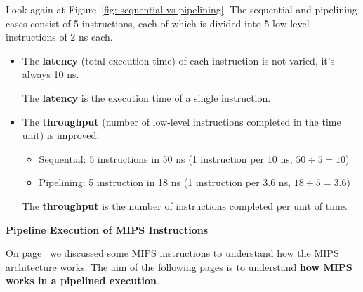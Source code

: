 \documentclass[a4paper]{article}
\newcommand{\definition}[1]{\textcolor{Red3}{\textbf{#1}}\index{#1}}
\newcommand{\highspace}{\vspace{1.2em}\noindent}
\begin{document}
    \highspace
    Look again at Figure~\ref{fig: sequential vs pipelining}. The sequential and pipelining cases consist of 5 instructions, each of which is divided into 5 low-level instructions of 2 ns each.
    \begin{itemize}
        \item The \textbf{latency} (total execution time) of each instruction is not varied, it's always 10 ns.
        \begin{definitionbox}
            The \definition{latency} is the execution time of a single instruction.
        \end{definitionbox}

        \item The \textbf{throughput} (number of low-level instructions completed in the time unit) is improved:
        \begin{itemize}
            \item Sequential: 5 instructions in 50 ns (1 instruction per 10 ns, $50 \div 5 = 10$)
            \item Pipelining: 5 instruction in 18 ns (1 instruction per 3.6 ns, $18 \div 5 = 3.6$)
        \end{itemize}
        \begin{definitionbox}
            The \definition{throughput} is the number of instructions completed per unit of time.
        \end{definitionbox}
    \end{itemize}

    \newpage

    \begin{center}
        \large
        \textcolor{Red3}{\textbf{Pipeline Execution of MIPS Instructions}}
    \end{center}
    On page~\pageref{Execution (EX) details} we discussed some MIPS instructions to understand how the MIPS architecture works. The aim of the following pages is to understand \textbf{how MIPS works in a pipelined execution}.
\end{document}
